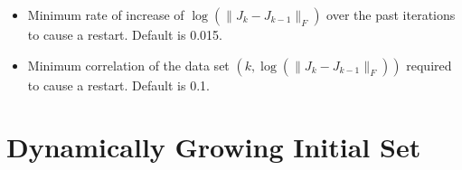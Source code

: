 \documentclass[letterpaper,10pt,english]{sphinxmanual}
\begin{document}
\begin{itemize}
\item {} 
\sphinxAtStartPar
{} \sphinxhyphen{} Minimum rate of increase of \(\log(\|J_k-J_{k-1}\|_F)\) over the past iterations to cause a restart. Default is 0.015.

\item {} 
\sphinxAtStartPar
{} \sphinxhyphen{} Minimum correlation of the data set \((k, \log(\|J_k-J_{k-1}\|_F))\) required to cause a restart. Default is 0.1.

\end{itemize}


\section{Dynamically Growing Initial Set}
\end{document}
